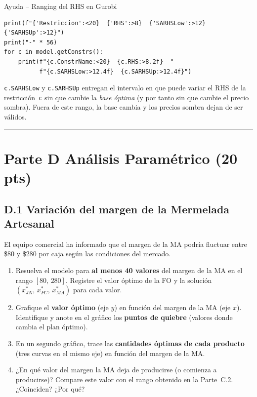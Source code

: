 \documentclass[12pt,a4paper]{article}
\begin{document}
\begin{ayuda}{Ayuda -- Ranging del RHS en Gurobi}
\begin{lstlisting}
print(f"{'Restriccion':<20}  {'RHS':>8}  {'SARHSLow':>12}  {'SARHSUp':>12}")
print("-" * 56)
for c in model.getConstrs():
    print(f"{c.ConstrName:<20}  {c.RHS:>8.2f}  "
          f"{c.SARHSLow:>12.4f}  {c.SARHSUp:>12.4f}")
\end{lstlisting}
\texttt{c.SARHSLow} y \texttt{c.SARHSUp} entregan el intervalo en que puede
variar el RHS de la restricción~\texttt{c} sin que cambie la \emph{base
óptima} (y por tanto sin que cambie el precio sombra). Fuera de este rango,
la base cambia y los precios sombra dejan de ser válidos.
\end{ayuda}

\noindent\rule{\linewidth}{0.4pt}
\newpage
\section*{Parte D \quad Análisis Paramétrico \hfill\normalfont\normalsize(20 pts)}

\subsection*{D.1 \quad Variación del margen de la Mermelada Artesanal}

El equipo comercial ha informado que el margen de la MA podría fluctuar
entre \$80 y \$280 por caja según las condiciones del mercado.

\begin{enumerate}[label=\alph*), leftmargin=*, topsep=2pt]
    \item Resuelva el modelo para \textbf{al menos 40 valores} del margen
          de la MA en el rango $[80,\,280]$. Registre el valor óptimo de
          la FO y la solución $(x_{JN}^*,\,x_{PC}^*,\,x_{MA}^*)$ para cada
          valor.
    \item Grafique el \textbf{valor óptimo} (eje $y$) en función del margen
          de la MA (eje $x$). Identifique y anote en el gráfico los
          \textbf{puntos de quiebre} (valores donde cambia el plan óptimo).
    \item En un segundo gráfico, trace las \textbf{cantidades óptimas de
          cada producto} (tres curvas en el mismo eje) en función del margen
          de la MA.
    \item ¿En qué valor del margen la MA deja de producirse (o comienza
          a producirse)? Compare este valor con el rango obtenido en la
          Parte~C.2. ¿Coinciden? ¿Por qué?
\end{enumerate}
\end{document}
